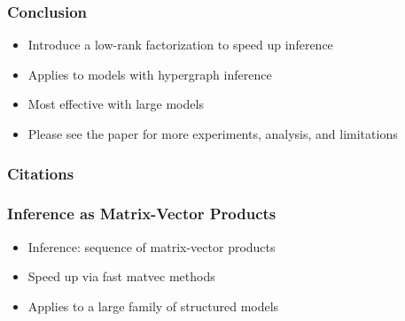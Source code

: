 \documentclass{beamer}
\begin{document}
\begin{frame}
\frametitle{Conclusion}
\begin{itemize}
\item Introduce a low-rank factorization to speed up inference
\vspace{2em}
\item Applies to models with hypergraph inference
\vspace{2em}
\item Most effective with large models
\vspace{2em}
\item Please see the paper for more experiments, analysis, and limitations
\end{itemize}
\end{frame}


\begin{frame}[allowframebreaks]
\frametitle{Citations}
\printbibliography
\end{frame}






\begin{frame}
\frametitle{Inference as Matrix-Vector Products}
\begin{itemize}
\item Inference: sequence of matrix-vector products
\vspace{1em}
\item Speed up via fast matvec methods 
\vspace{1em}
\item Applies to a large family of structured models
\end{itemize}
\end{frame}

\end{document}
